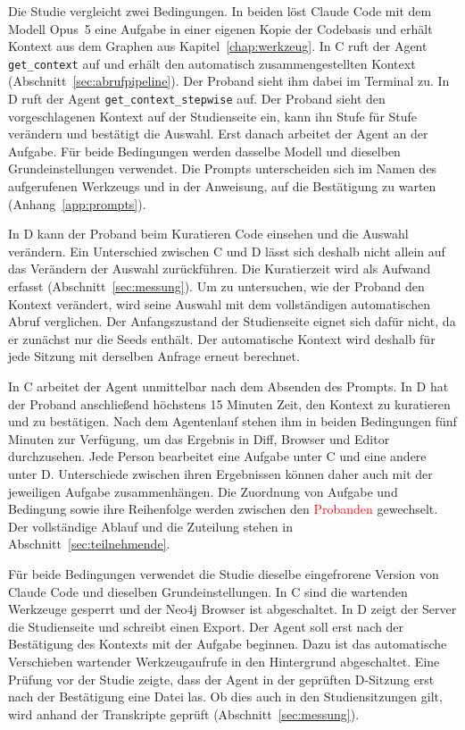 Die Studie vergleicht zwei Bedingungen. In beiden löst Claude Code mit dem Modell Opus~5 eine Aufgabe in einer eigenen Kopie der Codebasis und erhält Kontext aus dem Graphen aus Kapitel~\ref{chap:werkzeug}. In C ruft der Agent \texttt{get\_context} auf und erhält den automatisch zusammengestellten Kontext (Abschnitt~\ref{sec:abrufpipeline}). Der Proband sieht ihm dabei im Terminal zu. In D ruft der Agent \texttt{get\_context\_stepwise} auf. Der Proband sieht den vorgeschlagenen Kontext auf der Studienseite ein, kann ihn Stufe für Stufe verändern und bestätigt die Auswahl. Erst danach arbeitet der Agent an der Aufgabe. Für beide Bedingungen werden dasselbe Modell und dieselben Grundeinstellungen verwendet. Die Prompts unterscheiden sich im Namen des aufgerufenen Werkzeugs und in der Anweisung, auf die Bestätigung zu warten (Anhang~\ref{app:prompts}).

In D kann der Proband beim Kuratieren Code einsehen und die Auswahl verändern. Ein Unterschied zwischen C und D lässt sich deshalb nicht allein auf das Verändern der Auswahl zurückführen. Die Kuratierzeit wird als Aufwand erfasst (Abschnitt~\ref{sec:messung}). Um zu untersuchen, wie der Proband den Kontext verändert, wird seine Auswahl mit dem vollständigen automatischen Abruf verglichen. Der Anfangszustand der Studienseite eignet sich dafür nicht, da er zunächst nur die Seeds enthält. Der automatische Kontext wird deshalb für jede Sitzung mit derselben Anfrage erneut berechnet.

In C arbeitet der Agent unmittelbar nach dem Absenden des Prompts. In D hat der Proband anschließend höchstens 15 Minuten Zeit, den Kontext zu kuratieren und zu bestätigen. Nach dem Agentenlauf stehen ihm in beiden Bedingungen fünf Minuten zur Verfügung, um das Ergebnis in Diff, Browser und Editor durchzusehen. Jede Person bearbeitet eine Aufgabe unter C und eine andere unter D. Unterschiede zwischen ihren Ergebnissen können daher auch mit der jeweiligen Aufgabe zusammenhängen. Die Zuordnung von Aufgabe und Bedingung sowie ihre Reihenfolge werden zwischen den \textcolor{red}{Probanden} gewechselt. Der vollständige Ablauf und die Zuteilung stehen in Abschnitt~\ref{sec:teilnehmende}.

Für beide Bedingungen verwendet die Studie dieselbe eingefrorene Version von Claude Code und dieselben Grundeinstellungen. In C sind die wartenden Werkzeuge gesperrt und der Neo4j Browser ist abgeschaltet. In D zeigt der Server die Studienseite und schreibt einen Export. Der Agent soll erst nach der Bestätigung des Kontexts mit der Aufgabe beginnen. Dazu ist das automatische Verschieben wartender Werkzeugaufrufe in den Hintergrund abgeschaltet. Eine Prüfung vor der Studie zeigte, dass der Agent in der geprüften D-Sitzung erst nach der Bestätigung eine Datei las. Ob dies auch in den Studiensitzungen gilt, wird anhand der Transkripte geprüft (Abschnitt~\ref{sec:messung}).

